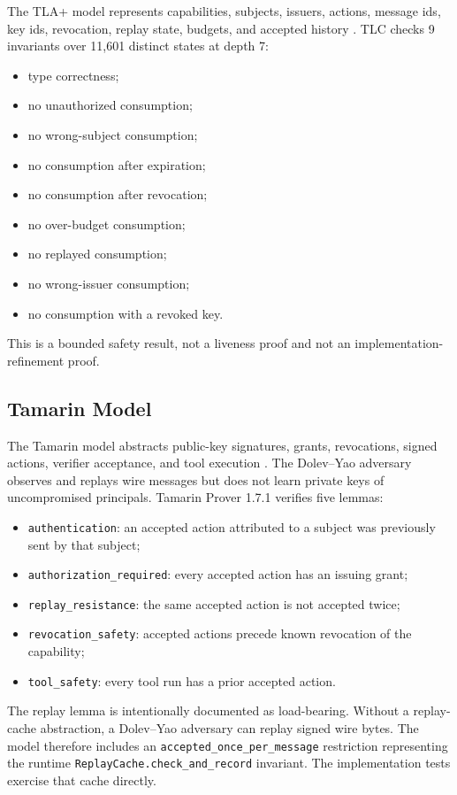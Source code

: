 \documentclass[runningheads]{llncs}
\begin{document}
The TLA+ model represents capabilities, subjects, issuers, actions, message ids, key ids, revocation, replay state, budgets, and accepted history \cite{lamport2002tla,tlatools}. TLC checks 9 invariants over 11,601 distinct states at depth 7:
\begin{itemize}
  \item type correctness;
  \item no unauthorized consumption;
  \item no wrong-subject consumption;
  \item no consumption after expiration;
  \item no consumption after revocation;
  \item no over-budget consumption;
  \item no replayed consumption;
  \item no wrong-issuer consumption;
  \item no consumption with a revoked key.
\end{itemize}
This is a bounded safety result, not a liveness proof and not an implementation-refinement proof.

\subsection{Tamarin Model}

The Tamarin model abstracts public-key signatures, grants, revocations, signed actions, verifier acceptance, and tool execution \cite{meier2013tamarin}. The Dolev--Yao adversary observes and replays wire messages but does not learn private keys of uncompromised principals. Tamarin Prover 1.7.1 verifies five lemmas:
\begin{itemize}
  \item \texttt{authentication}: an accepted action attributed to a subject was previously sent by that subject;
  \item \texttt{authorization\_required}: every accepted action has an issuing grant;
  \item \texttt{replay\_resistance}: the same accepted action is not accepted twice;
  \item \texttt{revocation\_safety}: accepted actions precede known revocation of the capability;
  \item \texttt{tool\_safety}: every tool run has a prior accepted action.
\end{itemize}

The replay lemma is intentionally documented as load-bearing. Without a replay-cache abstraction, a Dolev--Yao adversary can replay signed wire bytes. The model therefore includes an \texttt{accepted\_once\_per\_message} restriction representing the runtime \texttt{ReplayCache.check\_and\_record} invariant. The implementation tests exercise that cache directly.
\end{document}
